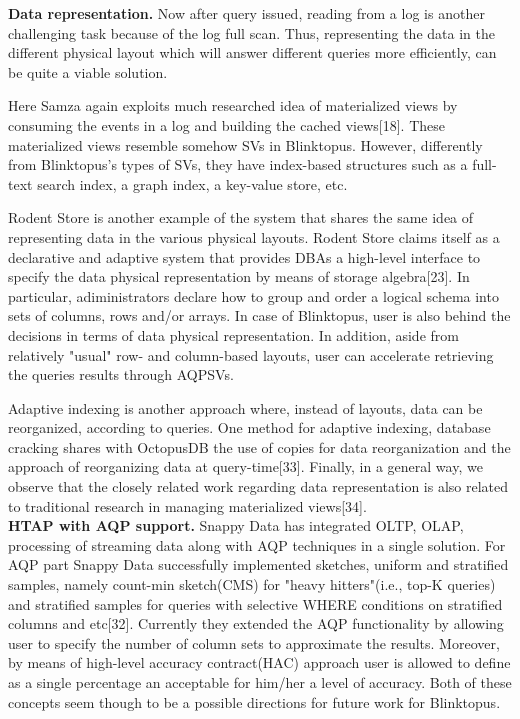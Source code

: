 \documentclass[10pt, conference, compsocconf]{IEEEtran}
\begin{document}
\textbf{Data representation.} Now after query issued, reading from a log is another challenging task because of the log full scan. Thus, representing the data in the different physical layout which will  answer different queries more efficiently, can be quite a viable solution. 

Here Samza again exploits much researched idea of materialized views by consuming the events in a log and building the cached views[18]. These materialized views resemble somehow SVs in Blinktopus. However, differently from Blinktopus's types of SVs, they have index-based structures such as a full-text search index, a graph index, a key-value store, etc. 

Rodent Store is another example of the system that shares the same idea of representing data in the various physical layouts. Rodent Store claims itself as a declarative and adaptive system that provides DBAs a high-level interface to specify the data physical representation by means of storage algebra[23]. In particular, adiministrators declare how to group and order a logical schema into sets of columns, rows and/or arrays. In case of Blinktopus, user is also behind the decisions in terms of data physical representation. In addition, aside from relatively "usual" row- and column-based layouts, user can accelerate retrieving the queries results through AQPSVs. 

Adaptive indexing is another approach where, instead of layouts, data can be reorganized, according to queries. One method for adaptive indexing, database cracking shares with OctopusDB the use of copies for data reorganization and the approach of reorganizing data at query-time[33]. Finally, in a general way,  we observe that the closely related work regarding data representation is also related to traditional research in managing materialized views[34]. \\
\textbf{HTAP with AQP support.} 
Snappy Data has integrated OLTP, OLAP, processing of streaming data along with  AQP techniques in a single solution. For AQP part Snappy Data successfully implemented sketches, uniform and stratified samples, namely count-min sketch(CMS) for "heavy hitters"(i.e., top-K queries) and stratified samples for queries with selective WHERE conditions on stratified columns and etc[32]. Currently they extended the AQP functionality by allowing user to specify the number of column sets to approximate the results. Moreover, by means of high-level accuracy contract(HAC) approach user is allowed to define as a single percentage an acceptable for him/her a level of accuracy. Both of these concepts seem though to be a possible directions for future work for Blinktopus.
\end{document}
